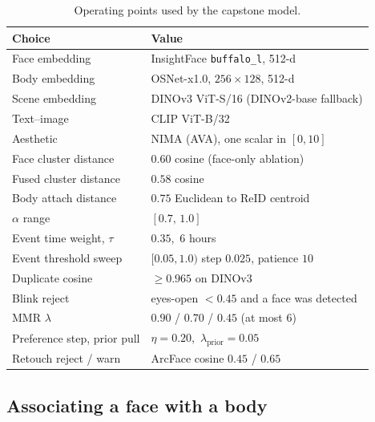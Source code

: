\documentclass[conference]{IEEEtran}
\begin{document}
\begin{table}[t]
\caption{Operating points used by the capstone model.}
\label{tab:operating}
\centering
\scriptsize
\begin{tabular}{@{}>{\raggedright\arraybackslash}p{3.05cm}>{\raggedright\arraybackslash}p{4.55cm}@{}}
\toprule
Choice & Value \\
\midrule
Face embedding & InsightFace \texttt{buffalo\_l}, 512-d \\
Body embedding & OSNet-x1.0, $256\times128$, 512-d \\
Scene embedding & \mbox{DINOv3} ViT-S/16 (DINOv2-base fallback) \\
Text--image & CLIP ViT-B/32 \\
Aesthetic & NIMA (AVA), one scalar in $[0,10]$ \\
Face cluster distance & $0.60$ cosine (face-only ablation) \\
Fused cluster distance & $0.58$ cosine \\
Body attach distance & $0.75$ Euclidean to ReID centroid \\
$\alpha$ range & $[0.7,\,1.0]$ \\
Event time weight, $\tau$ & $0.35$,\ $6$ hours \\
Event threshold sweep & $[0.05,1.0)$ step $0.025$, patience $10$ \\
Duplicate cosine & $\ge 0.965$ on \mbox{DINOv3} \\
Blink reject & eyes-open $< 0.45$ and a face was detected \\
MMR $\lambda$ & $0.90$ / $0.70$ / $0.45$ (at most 6) \\
Preference step, prior pull & $\eta=0.20$,\ $\lambda_{\mathrm{prior}}=0.05$ \\
Retouch reject / warn & ArcFace cosine $0.45$ / $0.65$ \\
\bottomrule
\end{tabular}
\end{table}

\subsection{Associating a face with a body}
\label{sec:assoc}
\end{document}

